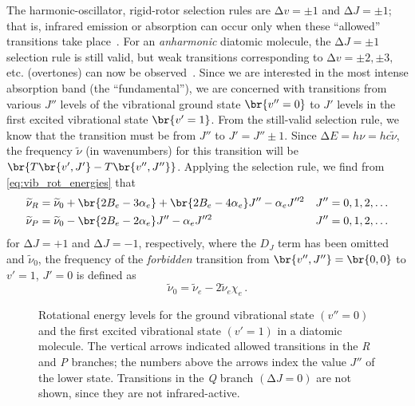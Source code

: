 The harmonic-oscillator, rigid-rotor selection rules are \( \increment v = \pm 1 \) and \( \increment J = \pm 1\); that is, infrared emission or absorption can occur only when these ``allowed'' transitions take place~\autocite{herzberg89}.
For an \emph{anharmonic} diatomic molecule, the \( \increment J = \pm 1 \) selection rule is still valid, but weak transitions corresponding to \( \increment v = \pm2, \pm3, \) etc. (overtones) can now be observed~\autocite{herzberg89}. 
Since we are interested in the most intense absorption band (the ``fundamental''), we are concerned with transitions from various \( J'' \) levels of the vibrational ground state \( \br{v'' = 0} \) to \( J' \) levels in the first excited vibrational state \( \br{v' = 1} \). 
From the still-valid selection rule, we know that the transition must be from \( J'' \) to \( J' = J'' \pm 1 \). 
Since \( \increment E = h \nu = h c \widetilde{\nu} \), the frequency \( \widetilde{\nu} \) (in wavenumbers) for this transition will be \( \br{T\br{v', J'} - T\br{v'', J''}} \). Applying the selection rule, we find from \cref{eq:vib_rot_energies} that
\begin{align}
	\widetilde{\nu}_R &= \widetilde{\nu}_0 + \br{2 B_e - 3 \alpha_e} + \br{2 B_e - 4 \alpha_e} J'' - \alpha_e J''^2 	&	J'' &= 0, 1, 2, \ldots 
	\label{eq:r_branch} 
	\\
	\widetilde{\nu}_P &= \widetilde{\nu}_0 -													 \br{2 B_e - 2 \alpha_e} J'' - \alpha_e J''^2 	&	J'' &= 0, 1, 2, \ldots 
	\label{eq:p_branch}
\end{align}
for \( \increment J = +1 \) and \( \increment J = -1 \), respectively, where the \( D_J \) term has been omitted and \( \widetilde{\nu}_0 \), the frequency of the \emph{forbidden} transition from \( {\br{v'',J''} = \br{0, 0}} \) to \( {v' = 1} \), \( {J' = 0} \) is defined as
\begin{equation}
	\widetilde{\nu}_0 = \widetilde{\nu}_e - 2 \widetilde{\nu}_e \chi_e \, .
	\label{eq:forbid_transition}
\end{equation}

\begin{figure}[tb]
  \centering
  	
    \caption{Rotational energy levels for the ground vibrational state \( {(v'' = 0)} \) and the first excited vibrational state \( {(v' = 1)} \) in a diatomic molecule.
      The vertical arrows indicated allowed transitions in the \emph{R} and \emph{P} branches; the numbers above the arrows index the value \( J'' \) of the lower state.
      Transitions in the \emph{Q} branch \( {(\increment J = 0)} \) are not shown, since they are not infrared-active.
      }
    \label{fig:typ_spectrum}
\end{figure}

